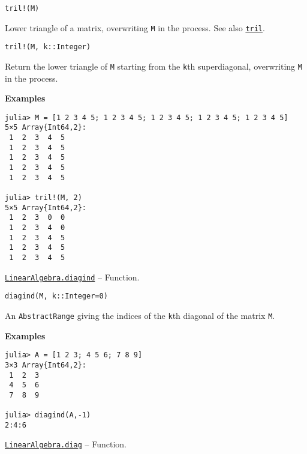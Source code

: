 \begin{adjustwidth}{2em}{0pt}


\begin{verbatim}
tril!(M)
\end{verbatim}

Lower triangle of a matrix, overwriting \texttt{M} in the process. See also \hyperlink{6919124555890239966}{\texttt{tril}}.




\begin{lstlisting}
tril!(M, k::Integer)
\end{lstlisting}

Return the lower triangle of \texttt{M} starting from the \texttt{k}th superdiagonal, overwriting \texttt{M} in the process.

\textbf{Examples}


\begin{verbatim}
julia> M = [1 2 3 4 5; 1 2 3 4 5; 1 2 3 4 5; 1 2 3 4 5; 1 2 3 4 5]
5×5 Array{Int64,2}:
 1  2  3  4  5
 1  2  3  4  5
 1  2  3  4  5
 1  2  3  4  5
 1  2  3  4  5

julia> tril!(M, 2)
5×5 Array{Int64,2}:
 1  2  3  0  0
 1  2  3  4  0
 1  2  3  4  5
 1  2  3  4  5
 1  2  3  4  5
\end{verbatim}



\end{adjustwidth}
\hypertarget{16168870718733561340}{} 
\hyperlink{16168870718733561340}{\texttt{LinearAlgebra.diagind}}  -- {Function.}

\begin{adjustwidth}{2em}{0pt}


\begin{verbatim}
diagind(M, k::Integer=0)
\end{verbatim}

An \texttt{AbstractRange} giving the indices of the \texttt{k}th diagonal of the matrix \texttt{M}.

\textbf{Examples}


\begin{verbatim}
julia> A = [1 2 3; 4 5 6; 7 8 9]
3×3 Array{Int64,2}:
 1  2  3
 4  5  6
 7  8  9

julia> diagind(A,-1)
2:4:6
\end{verbatim}



\end{adjustwidth}
\hypertarget{17079356950356685026}{} 
\hyperlink{17079356950356685026}{\texttt{LinearAlgebra.diag}}  -- {Function.}

